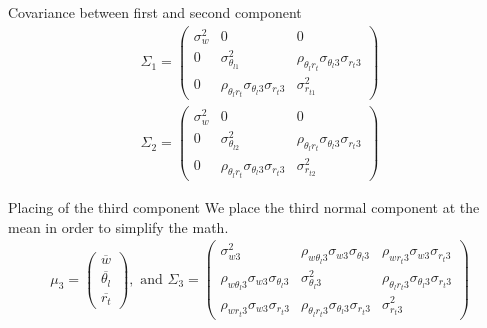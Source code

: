 \documentclass[10pt]{beamer}
\numberwithin{equation}{section}
\begin{document}
    \begin{frame}{Covariance between first and second component}
        \begin{align}
            \Sigma_1 =
            \begin{pmatrix}
                \sigma_w^2 & 0                                                      & 0                                                      \\
                0          & \sigma_{\theta_{l1}}^2                                 & \rho_{\theta_l r_t} \sigma_{\theta_l 3} \sigma_{r_t 3} \\
                0          & \rho_{\theta_l r_t} \sigma_{\theta_l 3} \sigma_{r_t 3} & \sigma_{r_{t1}}^2
            \end{pmatrix}
        \end{align}
        \begin{align}
            \Sigma_2 =
            \begin{pmatrix}
                \sigma_w^2 & 0                                                      & 0                                                      \\
                0          & \sigma_{\theta_{l2}}^2                                 & \rho_{\theta_l r_t} \sigma_{\theta_l 3} \sigma_{r_t 3} \\
                0          & \rho_{\theta_l r_t} \sigma_{\theta_l 3} \sigma_{r_t 3} & \sigma_{r_{t2}}^2
            \end{pmatrix}
        \end{align}
    \end{frame}

    \begin{frame}{Placing of the third component}
        We place the third normal component at the mean in order to simplify the math.
        \begin{align}
            \mu_3 =
            \begin{pmatrix}
                \overline{w}        \\
                \overline{\theta_l} \\
                \overline{r_t}
            \end{pmatrix},
            \text{ and }
            \Sigma_3 =
            \begin{pmatrix}
                \sigma_{w 3}^2 &
                \rho_{w \theta_l 3} \sigma_{w 3} \sigma_{\theta_l 3} &
                \rho_{w r_t 3} \sigma_{w 3} \sigma_{r_t 3} \\
                \rho_{w \theta_l 3} \sigma_{w 3} \sigma_{\theta_l 3} &
                \sigma_{\theta_l 3}^2 &
                \rho_{\theta_l r_t 3} \sigma_{\theta_l 3} \sigma_{r_t 3} \\
                \rho_{w r_t 3} \sigma_{w 3} \sigma_{r_t 3} &
                \rho_{\theta_l r_t 3} \sigma_{\theta_l 3} \sigma_{r_t 3} &
                \sigma_{r_t 3}^2
            \end{pmatrix}
        \end{align}
    \end{frame}
\end{document}
